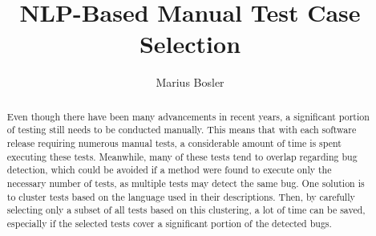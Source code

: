 \documentclass[runningheads]{llncs}
\begin{document}
\title{NLP-Based Manual Test Case Selection}
\author{Marius Bosler}
%
\maketitle %
%
%
\begin{abstract}
Even though there have been many advancements in recent years, a significant portion of testing still needs to be conducted manually. This means that with each software release requiring numerous manual tests, a considerable amount of time is spent executing these tests. Meanwhile, many of these tests tend to overlap regarding bug detection, which could be avoided if a method were found to execute only the necessary number of tests, as multiple tests may detect the same bug. One solution is to cluster tests based on the language used in their descriptions. Then, by carefully selecting only a subset of all tests based on this clustering, a lot of time can be saved, especially if the selected tests cover a significant portion of the detected bugs.

\end{abstract}
%
%







%
%


%
\end{document}
